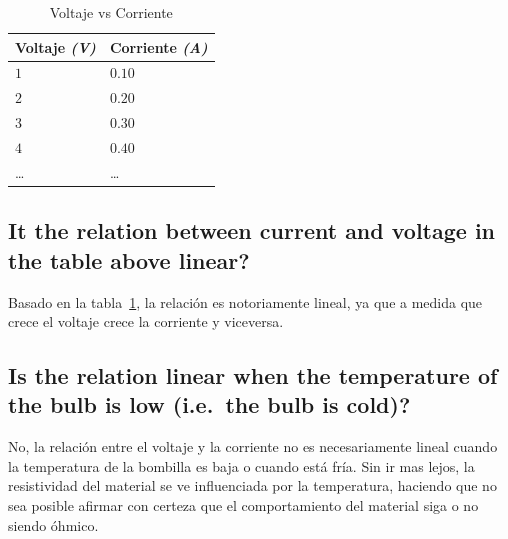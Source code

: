 \documentclass[twocolumn, 12pt]{article}
\begin{document}
\begin{table}[H]
    \begin{tabularx}{0.9\linewidth}{|>{\centering\arraybackslash}X|>{\centering\arraybackslash}X|}
        \hline
        Voltaje \textit{(V)} & Corriente \textit{(A)} \\\hline
        $1$                  & $0.10$                 \\\hline
        $2$                  & $0.20$                 \\\hline
        $3$                  & $0.30$                 \\\hline
        $4$                  & $0.40$                 \\\hline
        \dots                & \dots                  \\\hline
    \end{tabularx}

    \caption{Voltaje vs Corriente}
    \label{tab:voltaje-corriente}
\end{table}

\subsection{It the relation between current and voltage in the table above linear?}

Basado en la tabla~\ref{tab:voltaje-corriente}, la relación
es notoriamente lineal, ya que a medida que crece el
voltaje crece la corriente y viceversa.

\subsection{Is the relation linear when the temperature of the bulb is low (i.e.~the bulb is cold)?}

\nocite{KhanAcademy}

No, la relación entre el voltaje y la corriente no es
necesariamente lineal cuando la temperatura de la bombilla
es baja o cuando está fría. Sin ir mas lejos, la
resistividad del material se ve influenciada por la
temperatura, haciendo que no sea posible afirmar con
certeza que el comportamiento del material siga o no siendo
óhmico.

\printbibliography
\end{document}
